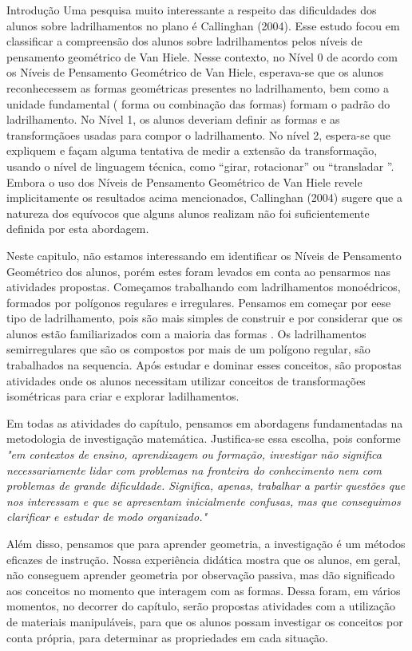 \begin{apresentacao}{Introdução}
Uma pesquisa muito interessante a respeito das dificuldades dos alunos sobre ladrilhamentos no plano é Callinghan (2004). Esse estudo focou em classificar a compreensão dos alunos sobre ladrilhamentos pelos níveis de pensamento geométrico de Van Hiele. Nesse contexto, no Nível 0 de acordo com os Níveis de Pensamento Geométrico de Van Hiele, esperava-se que os alunos reconhecessem as formas geométricas presentes no ladrilhamento, bem como a unidade fundamental ( forma ou combinação das formas) formam o padrão do ladrilhamento. No Nível 1, os alunos deveriam definir as formas e as transformçãoes  usadas para compor o ladrilhamento. No nível 2, espera-se que expliquem e façam alguma tentativa de medir a extensão da transformação, usando o nível de linguagem técnica, como “girar, rotacionar” ou “transladar ”. Embora o uso dos Níveis de Pensamento Geométrico de Van Hiele revele implicitamente os resultados acima mencionados, Callinghan (2004) sugere que a natureza dos equívocos que alguns alunos realizam não foi suficientemente definida por esta abordagem. 

Neste capitulo, não estamos interessando em identificar os Níveis de Pensamento Geométrico dos alunos, porém estes foram levados em conta ao pensarmos nas atividades propostas. Começamos trabalhando com ladrilhamentos monoédricos, formados por polígonos regulares e irregulares. Pensamos em começar por eese tipo de ladrilhamento, pois são mais simples de construir e por considerar que  os alunos estão familiarizados com a maioria das  formas . Os ladrilhamentos semirregulares que são os compostos por mais de um polígono regular, são trabalhados na sequencia. Após estudar e dominar esses conceitos, são propostas atividades onde os alunos necessitam utilizar conceitos de transformações isométricas para criar e explorar ladilhamentos.

Em todas as atividades do capítulo, pensamos em abordagens fundamentadas na metodologia de investigação matemática. Justifica-se essa escolha, pois conforme \cite[p.2]{Ponte} \textit{"em contextos de ensino, aprendizagem ou formação, investigar não significa necessariamente lidar com problemas na fronteira do conhecimento nem com problemas de grande dificuldade. Significa, apenas, trabalhar a partir questões que nos interessam e que se apresentam inicialmente confusas, mas que conseguimos clarificar e estudar de modo organizado." }

Além disso, pensamos que para aprender geometria, a investigação é um métodos eficazes de instrução. Nossa experiência didática mostra que os alunos, em geral, não conseguem aprender geometria por observação passiva, mas dão significado aos conceitos no momento que interagem com as formas. Dessa foram, em vários momentos, no decorrer do capítulo, serão propostas atividades com a utilização de materiais manipuláveis, para que os alunos possam investigar os conceitos por conta própria,  para determinar as propriedades em cada situação. 



\end{apresentacao}
